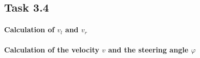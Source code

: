 \documentclass{article}
\begin{document}
	\subsection{Task 3.4}
	\paragraph{Calculation of $v_{l}$ and $v_{r}$}
	
	\paragraph{Calculation of the velocity $v$ and the steering angle $\varphi$}
	
\end{document}
